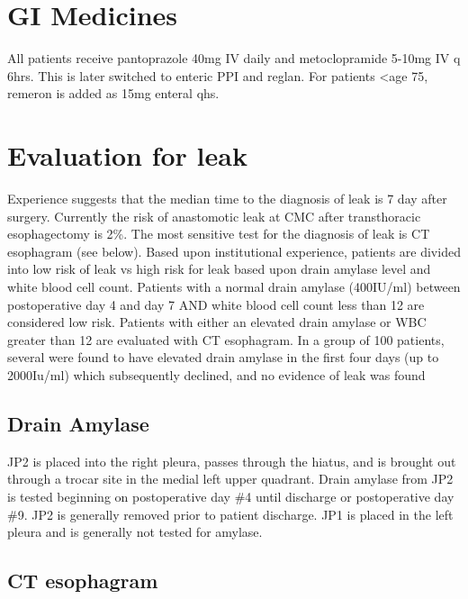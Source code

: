 \documentclass[
  letterpaper,
]{scrbook}
\begin{document}
\section{GI Medicines}\label{gi-medicines}

All patients receive pantoprazole 40mg IV daily and metoclopramide
5-10mg IV q 6hrs. This is later switched to enteric PPI and reglan. For
patients \textless age 75, remeron is added as 15mg enteral qhs.

\section{Evaluation for leak}\label{leak_evaluation}

Experience suggests that the median time to the diagnosis of leak is 7
day after surgery. Currently the risk of anastomotic leak at CMC after
transthoracic esophagectomy is 2\%. The most sensitive test for the
diagnosis of leak is CT esophagram (see below). Based upon institutional
experience, patients are divided into low risk of leak vs high risk for
leak based upon drain amylase level and white blood cell count. Patients
with a normal drain amylase (400IU/ml) between postoperative day 4 and
day 7 AND white blood cell count less than 12 are considered low risk.
Patients with either an elevated drain amylase or WBC greater than 12
are evaluated with CT esophagram. In a group of 100 patients, several
were found to have elevated drain amylase in the first four days (up to
2000Iu/ml) which subsequently declined, and no evidence of leak was
found

\subsection{Drain Amylase}\label{drain_amylase}

JP2 is placed into the right pleura, passes through the hiatus, and is
brought out through a trocar site in the medial left upper quadrant.
Drain amylase from JP2 is tested beginning on postoperative day \#4
until discharge or postoperative day \#9. JP2 is generally removed prior
to patient discharge. JP1 is placed in the left pleura and is generally
not tested for amylase.

\subsection{CT esophagram}\label{ct_esophagram}
\end{document}
